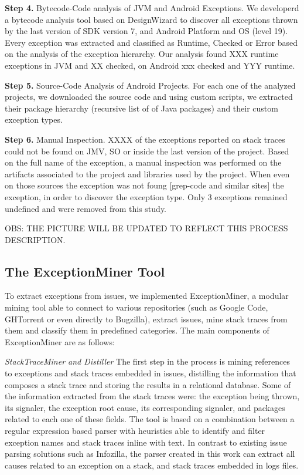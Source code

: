 \documentclass[conference]{IEEEtran}
\begin{document}
\textbf{Step 4.}  Bytecode-Code analysis of JVM and Android Exceptions. We developerd a bytecode analysis tool based on DesignWizard to discover all exceptions thrown by the last version of SDK version 7, and Android Platform and OS (level 19). Every exception was extracted and classified as Runtime, Checked or Error based on the analysis of the exception hierarchy. Our analysis found XXX runtime exceptions in JVM and XX checked, on Android xxx checked and YYY runtime.

\textbf{Step 5.}  Source-Code Analysis of Android Projects. 
For each one of the analyzed projects, we
downloaded the source code and using custom scripts, we extracted their package
hierarchy (recursive list of of Java packages) and their custom exception types.

\textbf{Step 6.}  Manual Inspection. XXXX of the exceptions reported on stack traces  could not be found on JMV, SO or inside the last version of the project. Based on the full name of the exception, a manual inspection was performed on the artifacts associated to the project and libraries used by the project. When even on those sources the exception was not foung [grep-code and similar sites] the exception, in order to discover the exception type. Only 3 exceptions remained undefined and were removed from this study.

OBS: THE PICTURE WILL BE UPDATED TO REFLECT THIS PROCESS DESCRIPTION.

\subsection{The ExceptionMiner Tool}
\label{sec:exceptionminer}

To extract exceptions from issues, we implemented ExceptionMiner, a modular
mining tool able to connect to various repositories (such as Google Code,
GHTorrent or even directly to Bugzilla), extract issues, mine stack traces from
them and classify them in predefined categories. The main components of
ExceptionMiner are as follows:

\noindent\emph{StackTraceMiner and Distiller} The first step in the process is
mining references to exceptions and stack traces embedded in issues, distilling
the information that composes a stack trace and storing the results in a
relational database. Some of the information extracted from the stack traces were:
 the exception being thrown, its signaler, the exception root cause, its corresponding signaler,
and packages related to each one of these fields.
The tool is based on a combination between a regular expression based parser 
with heuristics able to identify and filter exception names and stack traces inline with text. In
contrast to existing issue parsing solutions such as Infozilla, the parser
created in this work can extract all causes related to an exception on a stack,
and stack traces embedded in logs files.
\end{document}
